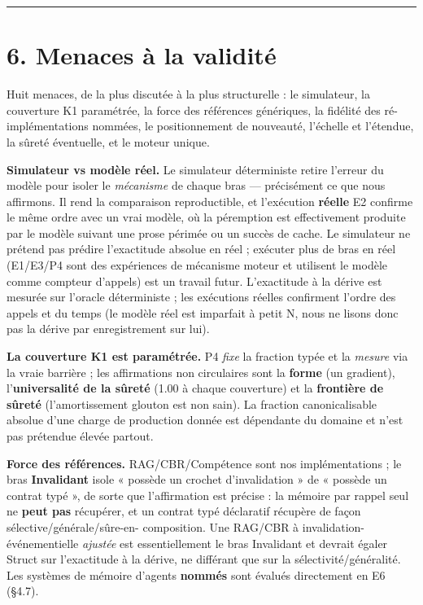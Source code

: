 \documentclass[11pt]{article}
\begin{document}
\medskip\hrule\medskip

\section*{6. Menaces à la validité}

Huit menaces, de la plus discutée à la plus structurelle : le simulateur, la couverture K1 paramétrée, la force des références génériques, la fidélité des ré-implémentations nommées, le positionnement de nouveauté, l'échelle et l'étendue, la sûreté éventuelle, et le moteur unique.

\textbf{Simulateur vs modèle réel.} Le simulateur déterministe retire l'erreur du modèle pour isoler le \emph{mécanisme} de chaque bras — précisément ce que nous affirmons. Il rend la comparaison reproductible, et l'exécution \textbf{réelle} E2 confirme le même ordre avec un vrai modèle, où la péremption est effectivement produite par le modèle suivant une prose périmée ou un succès de cache. Le simulateur ne prétend pas prédire l'exactitude absolue en réel ; exécuter plus de bras en réel (E1/E3/P4 sont des expériences de mécanisme moteur et utilisent le modèle comme compteur d'appels) est un travail futur. L'exactitude à la dérive est mesurée sur l'oracle déterministe ; les exécutions réelles confirment l'ordre des appels et du temps (le modèle réel est imparfait à petit N, nous ne lisons donc pas la dérive par enregistrement sur lui).

\textbf{La couverture K1 est paramétrée.} P4 \emph{fixe} la fraction typée et la \emph{mesure} via la vraie barrière ; les affirmations non circulaires sont la \textbf{forme} (un gradient), l'\textbf{universalité de la sûreté} (1.00 à chaque couverture) et la \textbf{frontière de sûreté} (l'amortissement glouton est non sain). La fraction canonicalisable absolue d'une charge de production donnée est dépendante du domaine et n'est pas prétendue élevée partout.

\textbf{Force des références.} RAG/CBR/Compétence sont nos implémentations ; le bras \textbf{Invalidant} isole « possède un crochet d'invalidation » de « possède un contrat typé », de sorte que l'affirmation est précise : la mémoire par rappel seul ne \textbf{peut pas} récupérer, et un contrat typé déclaratif récupère de façon sélective/générale/sûre-en- composition. Une RAG/CBR à invalidation-événementielle \emph{ajustée} est essentiellement le bras Invalidant et devrait égaler Struct sur l'exactitude à la dérive, ne différant que sur la sélectivité/généralité. Les systèmes de mémoire d'agents \textbf{nommés} sont évalués directement en E6 (§4.7).
\end{document}
